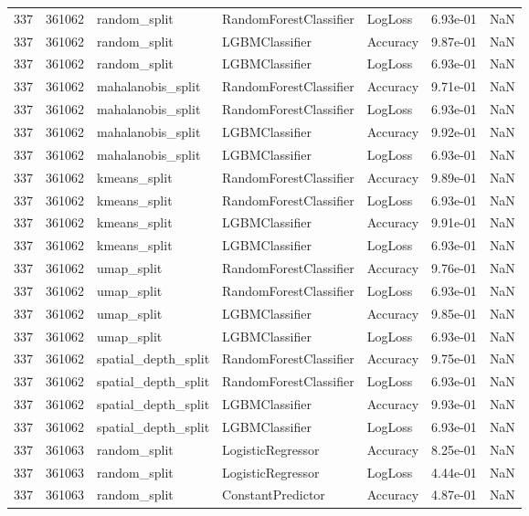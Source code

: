 \begin{tabular}{rrlllrr}
337 & 361062 & random\_split & RandomForestClassifier & LogLoss & 6.93e-01 & NaN \\
337 & 361062 & random\_split & LGBMClassifier & Accuracy & 9.87e-01 & NaN \\
337 & 361062 & random\_split & LGBMClassifier & LogLoss & 6.93e-01 & NaN \\
337 & 361062 & mahalanobis\_split & RandomForestClassifier & Accuracy & 9.71e-01 & NaN \\
337 & 361062 & mahalanobis\_split & RandomForestClassifier & LogLoss & 6.93e-01 & NaN \\
337 & 361062 & mahalanobis\_split & LGBMClassifier & Accuracy & 9.92e-01 & NaN \\
337 & 361062 & mahalanobis\_split & LGBMClassifier & LogLoss & 6.93e-01 & NaN \\
337 & 361062 & kmeans\_split & RandomForestClassifier & Accuracy & 9.89e-01 & NaN \\
337 & 361062 & kmeans\_split & RandomForestClassifier & LogLoss & 6.93e-01 & NaN \\
337 & 361062 & kmeans\_split & LGBMClassifier & Accuracy & 9.91e-01 & NaN \\
337 & 361062 & kmeans\_split & LGBMClassifier & LogLoss & 6.93e-01 & NaN \\
337 & 361062 & umap\_split & RandomForestClassifier & Accuracy & 9.76e-01 & NaN \\
337 & 361062 & umap\_split & RandomForestClassifier & LogLoss & 6.93e-01 & NaN \\
337 & 361062 & umap\_split & LGBMClassifier & Accuracy & 9.85e-01 & NaN \\
337 & 361062 & umap\_split & LGBMClassifier & LogLoss & 6.93e-01 & NaN \\
337 & 361062 & spatial\_depth\_split & RandomForestClassifier & Accuracy & 9.75e-01 & NaN \\
337 & 361062 & spatial\_depth\_split & RandomForestClassifier & LogLoss & 6.93e-01 & NaN \\
337 & 361062 & spatial\_depth\_split & LGBMClassifier & Accuracy & 9.93e-01 & NaN \\
337 & 361062 & spatial\_depth\_split & LGBMClassifier & LogLoss & 6.93e-01 & NaN \\
337 & 361063 & random\_split & LogisticRegressor & Accuracy & 8.25e-01 & NaN \\
337 & 361063 & random\_split & LogisticRegressor & LogLoss & 4.44e-01 & NaN \\
337 & 361063 & random\_split & ConstantPredictor & Accuracy & 4.87e-01 & NaN \\

\end{tabular}
